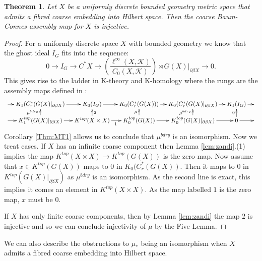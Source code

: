 \documentclass[preprint]{elsarticle}
\theoremstyle{plain}
\newtheorem{theorem}{Theorem}%
\theoremstyle{definition}%
\theoremstyle{remark}%
\begin{document}
\begin{theorem}\label{thm:mcor1}
Let $X$ be a uniformly discrete bounded geometry metric space that admits a fibred coarse embedding into Hilbert space. Then the coarse Baum-Connes assembly map for $X$ is injective.
\end{theorem}
\begin{proof}
For a uniformly discrete space $X$ with bounded geometry we know that the ghost ideal $I_{G}$ fits into the sequence:
\begin{equation*}
0 \rightarrow I_{G} \rightarrow C^{*}X \rightarrow (\frac{\ell^{\infty}(X,\mathcal{K})}{C_{0}(X,\mathcal{K})})\rtimes G(X)|_{\partial\beta X} \rightarrow 0.
\end{equation*}
This gives rise to the ladder in K-theory and K-homology where the rungs are the assembly maps defined in \cite{mypub1}:
$$
\xymatrix@=1em{
\ar[r] & K_{1}(C^{*}_{r}(G(X)|_{\partial\beta X}) \ar[r] & K_{0}(I_{G}) \ar[r]& K_{0}(C^{*}_{r}(G(X))) \ar[r]& K_{0}(C^{*}_{r}(G(X)|_{\partial\beta X})\ar[r] & K_{1}(I_{G}) \ar[r] & \\
\ar[r] & K_{1}^{top}(G(X)|_{\partial\beta X}) \ar[r] \ar[u]^{\mu^{bdry}}& K^{top}(X \times X) \ar[r]_{1}\ar[u]_{2}& K_{0}^{top}(G(X)) \ar[r]\ar[u]^{\mu}& K_{0}^{top}(G(X)|_{\partial\beta X}) \ar[r]\ar[u]^{\mu^{bdry}}& 0\ar[u]^{0} \ar[r] &
}
$$
Corollary \ref{Thm:MT1} allows us to conclude that $\mu^{bdry}$ is an isomorphism. Now we treat cases. If $X$ has an infinite coarse component then Lemma \ref{lem:zandi}.(1) implies the map $K^{top}(X\times X) \rightarrow K^{top}(G(X))$ is the zero map. Now assume that $x \in K^{top}(G(X))$ maps to $0$ in $K_{0}(C^{*}_{r}(G(X))$. Then it maps to $0$ in $K^{top}(G(X)|_{\partial\beta X})$ as $\mu^{bdry}$ is an isomorphism. As the second line is exact, this implies it comes an element in $K^{top}(X\times X)$. As the map labelled $1$ is the zero map, $x$ must be $0$.

If $X$ has only finite coarse components, then by Lemma \ref{lem:zandi} the map $2$ is injective and so we can conclude injectivity of $\mu$ by the Five Lemma.
\end{proof}

We can also describe the obstructions to $\mu_{*}$ being an isomorphism when $X$ admits a fibred coarse embedding into Hilbert space.
\end{document}
